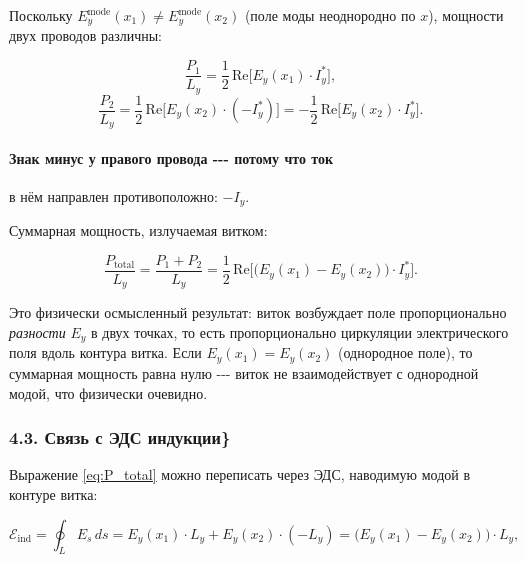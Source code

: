 \documentclass[11pt]{article}
\begin{document}
Поскольку \(E_y^{\mathrm{mode}}(x_1) \neq E_y^{\mathrm{mode}}(x_2)\)
(поле моды неоднородно по \(x\)), мощности двух проводов различны:

\begin{equation*}
    \frac{P_1}{L_y}
    = \frac{1}{2}\,\mathrm{Re}\bigl[E_y(x_1)\cdot I_y^*\bigr],
\end{equation*}\begin{equation*}
    \frac{P_2}{L_y}
    = \frac{1}{2}\,\mathrm{Re}\bigl[E_y(x_2)\cdot(-I_y^*)\bigr]
    = -\frac{1}{2}\,\mathrm{Re}\bigl[E_y(x_2)\cdot I_y^*\bigr].
\end{equation*}

\paragraph{Знак минус у правого провода -\/-\/- потому что
ток}\label{ux437ux43dux430ux43a-ux43cux438ux43dux443ux441-ux443-ux43fux440ux430ux432ux43eux433ux43e-ux43fux440ux43eux432ux43eux434ux430-----ux43fux43eux442ux43eux43cux443-ux447ux442ux43e-ux442ux43eux43a}

в нём направлен противоположно: \(-I_y\).

Суммарная мощность, излучаемая витком:

\begin{equation}
    \boxed{
        \frac{P_{\mathrm{total}}}{L_y}
        = \frac{P_1 + P_2}{L_y}
        = \frac{1}{2}\,\mathrm{Re}\bigl[
            \bigl(E_y(x_1) - E_y(x_2)\bigr)\cdot I_y^*
          \bigr].
    }
    \label{eq:P_total}
\end{equation}

Это физически осмысленный результат: виток возбуждает поле
пропорционально \emph{разности} \(E_y\) в двух точках, то есть
пропорционально циркуляции электрического поля вдоль контура витка. Если
\(E_y(x_1) = E_y(x_2)\) (однородное поле), то суммарная мощность равна
нулю -\/-\/- виток не взаимодействует с однородной модой, что физически
очевидно.

\subsubsection{4.3. Связь с ЭДС
индукции\}}\label{ux441ux432ux44fux437ux44c-ux441-ux44dux434ux441-ux438ux43dux434ux443ux43aux446ux438ux438}

Выражение \eqref{eq:P_total} можно переписать через ЭДС, наводимую модой
в контуре витка:

\begin{equation*}
    \mathcal{E}_{\mathrm{ind}}
    = \oint_L E_s\,ds
    = E_y(x_1)\cdot L_y + E_y(x_2)\cdot(-L_y)
    = \bigl(E_y(x_1) - E_y(x_2)\bigr)\cdot L_y,
\end{equation*}
\end{document}
